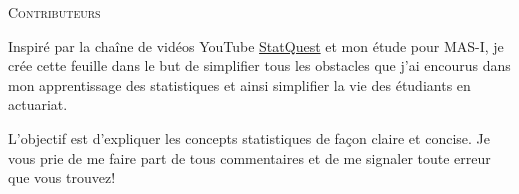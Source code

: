 \documentclass[10pt, french]{article}
\begin{document}
\begin{center}
	\textsc{\Large Contributeurs}\\[0.5cm] 
\end{center}


\begin{rappel_enhanced}[Motivation]
Inspiré par la chaîne de vidéos YouTube \href{https://www.youtube.com/user/joshstarmer}{\color{azure(colorwheel)}StatQuest} et mon étude pour MAS-I, je crée cette feuille dans le but de simplifier tous les obstacles que j'ai encourus dans mon apprentissage des statistiques et ainsi simplifier la vie des étudiants en actuariat.

L'objectif est d'expliquer les concepts statistiques de façon claire et concise. Je vous prie de me faire part de tous commentaires et de me signaler toute erreur que vous trouvez! 
\end{rappel_enhanced}

\newpage
\end{document}
